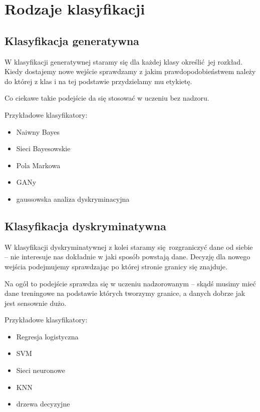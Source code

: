 \section{Rodzaje klasyfikacji}

\subsection{Klasyfikacja generatywna}

W klasyfikacji generatywnej staramy się dla każdej klasy określić jej rozkład. Kiedy dostajemy nowe wejście sprawdzamy z jakim prawdopodobieństwem należy do której z klas i na tej podstawie przydzielamy mu etykietę.

Co ciekawe takie podejście da się stosować w uczeniu bez nadzoru.

Przykładowe klasyfikatory:
\begin{itemize}
    \item Naiwny Bayes
    \item Sieci Bayesowskie
    \item Pola Markowa
    \item GANy
    \item gaussowska analiza dyskryminacyjna
\end{itemize}

\subsection{Klasyfikacja dyskryminatywna}

W klasyfikacji dyskryminatywnej z kolei staramy się rozgraniczyć dane od siebie -- nie interesuje nas dokładnie w jaki sposób powstają dane.
Decyzję dla nowego wejścia podejmujemy sprawdzając po której stronie granicy się znajduje.

Na ogół to podejście sprawdza się w uczeniu nadzorowanym -- skądś musimy mieć dane treningowe na podstawie których tworzymy granice, a danych dobrze jak jest sensownie dużo.

Przykładowe klasyfikatory:
\begin{itemize}
    \item Regresja logistyczna
    \item SVM
    \item Sieci neuronowe
    \item KNN
    \item drzewa decyzyjne
\end{itemize}